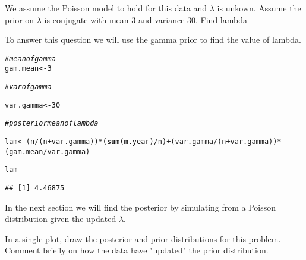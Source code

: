 \documentclass[12pt]{article}\usepackage[]{graphicx}\usepackage[]{color}
\makeatletter
\newcommand{\hlnum}[1]{\textcolor[rgb]{0.686,0.059,0.569}{#1}}%
\newcommand{\hlcom}[1]{\textcolor[rgb]{0.678,0.584,0.686}{\textit{#1}}}%
\newcommand{\hlopt}[1]{\textcolor[rgb]{0,0,0}{#1}}%
\newcommand{\hlstd}[1]{\textcolor[rgb]{0.345,0.345,0.345}{#1}}%
\newcommand{\hlkwb}[1]{\textcolor[rgb]{0.69,0.353,0.396}{#1}}%
\newcommand{\hlkwd}[1]{\textcolor[rgb]{0.737,0.353,0.396}{\textbf{#1}}}%
\newenvironment{kframe}{%
 \def\at@end@of@kframe{}%
 \ifinner\ifhmode%
  \def\at@end@of@kframe{\end{minipage}}%
  \begin{minipage}{\columnwidth}%
 \fi\fi%
 \def\FrameCommand##1{\hskip\@totalleftmargin \hskip-\fboxsep
 \colorbox{shadecolor}{##1}\hskip-\fboxsep
     \hskip-\linewidth \hskip-\@totalleftmargin \hskip\columnwidth}%
 \MakeFramed {\advance\hsize-\width
   \@totalleftmargin\z@ \linewidth\hsize
   \@setminipage}}%
 {\par\unskip\endMakeFramed%
 \at@end@of@kframe}
\newenvironment{knitrout}{}{} %
\newenvironment{problem}[2][Problem]{\begin{trivlist}
\item[\hskip \labelsep {\bfseries #1}\hskip \labelsep {\bfseries #2.}]}{\end{trivlist}}
\makeatother
\begin{document}
 \begin{problem}{b}
 We assume the Poisson model to hold for this data and $\lambda$ is unkown. Assume the prior on $\lambda$ is conjugate with mean 3 and variance 30. Find lambda
 \end{problem}
 
 To answer this question we will use the gamma prior to find the value of lambda.
 
\begin{knitrout}
\color{fgcolor}\begin{kframe}
\begin{alltt}
\hlcom{# mean of gamma}
\hlstd{gam.mean} \hlkwb{<-} \hlnum{3}

\hlcom{# var of gamma }

\hlstd{var.gamma} \hlkwb{<-} \hlnum{30}

\hlcom{# posterior mean of lambda}

\hlstd{lam} \hlkwb{<-} \hlstd{(n}\hlopt{/}\hlstd{(n}\hlopt{+}\hlstd{var.gamma))} \hlopt{*} \hlstd{(}\hlkwd{sum}\hlstd{(m.year)}\hlopt{/}\hlstd{n)} \hlopt{+} \hlstd{(var.gamma}\hlopt{/}\hlstd{(n}\hlopt{+}\hlstd{var.gamma))}\hlopt{*}\hlstd{(gam.mean}\hlopt{/}\hlstd{var.gamma)}

\hlstd{lam}
\end{alltt}
\begin{verbatim}
## [1] 4.46875
\end{verbatim}
\end{kframe}
\end{knitrout}
 In the next section we will find the posterior by simulating from a Poisson distribution given the updated $\lambda$.
 
 \begin{problem}{c}
 In a single plot, draw the posterior and prior distributions for this problem. Comment briefly on how the data have "updated" the prior distribution.
 \end{problem}
 
\end{document}
